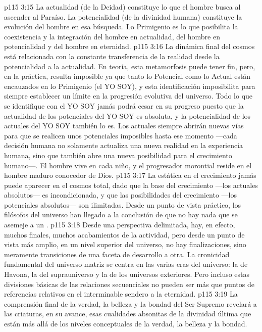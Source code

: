 \vs p115 3:15 La actualidad (de la Deidad) constituye lo que el hombre busca al ascender al Paraíso. La potencialidad (de la divinidad humana) constituye la evolución del hombre en esa búsqueda. Lo Primigenio es lo que posibilita la coexistencia y la integración del hombre en actualidad, del hombre en potencialidad y del hombre en eternidad.
\vs p115 3:16 \pc La dinámica final del cosmos está relacionada con la constante transferencia de la realidad desde la potencialidad a la actualidad. En teoría, esta metamorfosis puede tener fin, pero, en la práctica, resulta imposible ya que tanto lo Potencial como lo Actual están encauzados en lo Primigenio (el YO SOY), y esta identificación imposibilita para siempre establecer un límite en la progresión evolutiva del universo. Todo lo que se identifique con el YO SOY jamás podrá cesar en su progreso puesto que la actualidad de los potenciales del YO SOY es absoluta, y la potencialidad de los actuales del YO SOY también lo es. Los actuales siempre abrirán nuevas vías para que se realicen unos potenciales imposibles hasta ese momento ---cada decisión humana no solamente actualiza una nueva realidad en la experiencia humana, sino que también abre una nueva posibilidad para el crecimiento humano---. El hombre vive en cada niño, y el progresador morontial reside en el hombre maduro conocedor de Dios.
\vs p115 3:17 La estática en el crecimiento jamás puede aparecer en el cosmos total, dado que la base del crecimiento ---los actuales absolutos--- es incondicionada, y que las posibilidades del crecimiento ---los potenciales absolutos--- son ilimitadas. Desde un punto de vista práctico, los filósofos del universo han llegado a la conclusión de que no hay nada que se asemeje a un .
\vs p115 3:18 Desde una perspectiva delimitada, hay, en efecto, muchos finales, muchos acabamientos de la actividad, pero desde un punto de vista más amplio, en un nivel superior del universo, no hay finalizaciones, sino meramente transiciones de una faceta de desarrollo a otra. La cronicidad fundamental del universo matriz se centra en las varias eras del universo: la de Havona, la del suprauniverso y la de los universos exteriores. Pero incluso estas divisiones básicas de las relaciones secuenciales no pueden ser más que puntos de referencias relativos en el interminable sendero a la eternidad.
\vs p115 3:19 La comprensión final de la verdad, la belleza y la bondad del Ser Supremo revelará a las criaturas, en su avance, esas cualidades absonitas de la divinidad última que están más allá de los niveles conceptuales de la verdad, la belleza y la bondad.
